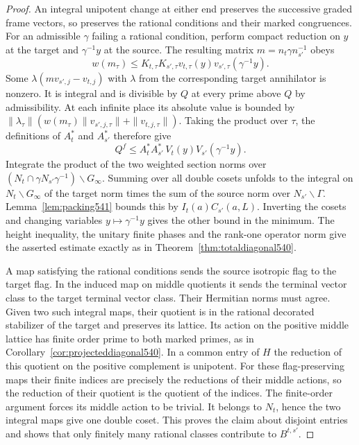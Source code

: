 \documentclass[a4paper,11pt]{article}
\theoremstyle{definition}
\theoremstyle{remark}
\numberwithin{equation}{section}
\begin{document}
\begin{proof}
An integral unipotent change at either end preserves the
successive graded frame vectors, so preserves the rational
conditions and their marked congruences. For an admissible
\(\gamma\) failing a rational condition, perform compact reduction
on \(y\) at the target and \(\gamma^{-1}y\) at the source. The
resulting matrix \(m=n_t\gamma n_{s'}^{-1}\) obeys
\[
  w(m_\tau)\le K_{t,\tau}K_{s',\tau}
                v_{t,\tau}(y)v_{s',\tau}(\gamma^{-1}y).
\]
Some \(\lambda(mv_{s',j}-v_{t,j})\) with \(\lambda\) from the
corresponding target annihilator is nonzero. It is integral and
is divisible by \(Q\) at every prime above \(Q\) by admissibility.
At each infinite place its absolute value is bounded by
\(\|\lambda_\tau\|(w(m_\tau)\|v_{s',j,\tau}\|+\|v_{t,j,\tau}\|)\).
Taking the product over \(\tau\), the definitions of \(A_t^*\)
and \(A_{s'}^*\) therefore give
\[
           Q^f\le A_t^* A_{s'}^*\, V_t(y)V_{s'}(\gamma^{-1}y).
\]
Integrate the product of the two weighted section norms over
\((N_t\cap\gamma N_{s'}\gamma^{-1})\backslash G_\infty\).
Summing over all double cosets unfolds to the integral on
\(N_t\backslash G_\infty\) of the target norm times the sum
of the source norm over \(N_{s'}\backslash\Gamma\).
Lemma~\ref{lem:packing541} bounds this by \(I_t(a)C_{s'}(a,L)\).
Inverting the cosets and changing variables
\(y\mapsto\gamma^{-1}y\) gives the other bound in the minimum.
The height inequality, the unitary finite phases and the
rank-one operator norm give the asserted estimate exactly
as in Theorem~\ref{thm:totaldiagonal540}.

A map satisfying the rational conditions sends the source
isotropic flag to the target flag. In the induced map on middle
quotients it sends the terminal vector class to the target
terminal vector class. Their Hermitian norms must agree.
Given two such integral maps, their quotient is in the rational
decorated stabilizer of the target and preserves its lattice.
Its action on the positive middle lattice has finite order prime
to both marked primes, as in Corollary~\ref{cor:projecteddiagonal540}.
In a common entry of \(H\) the reduction of this quotient on the
positive complement is unipotent. For these flag-preserving maps
their finite indices are precisely the reductions of their
middle actions, so the reduction of their quotient is the
quotient of the indices. The finite-order argument forces its
middle action to be trivial. It belongs to \(N_t\), hence the
two integral maps give one double coset. This proves the claim
about disjoint entries and shows that only finitely many rational
classes contribute to \(B^{t,s'}\).
\end{proof}
\end{document}

